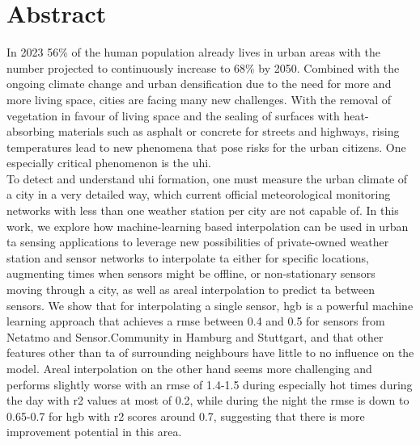 \chapter*{Abstract}
In 2023 56\% of the human population already lives in urban areas with the number projected to continuously increase to 68\% by 2050. Combined with the ongoing climate change and urban densification due to the need for more and more living space, cities are facing many new challenges. With the removal of vegetation in favour of living space and the sealing of surfaces with heat-absorbing materials such as asphalt or concrete for streets and highways, rising temperatures lead to new phenomena that pose risks for the urban citizens. One especially critical phenomenon is the \gls{uhi}.\\
To detect and understand \gls{uhi} formation, one must measure the urban climate of a city in a very detailed way, which current official meteorological monitoring networks with less than one weather station per city are not capable of. In this work, we explore how machine-learning based interpolation can be used in urban \gls{ta} sensing applications to leverage new possibilities of private-owned weather station and sensor networks to interpolate \gls{ta} either for specific locations, augmenting times when sensors might be offline, or non-stationary sensors moving through a city, as well as areal interpolation to predict \gls{ta} between sensors. We show that for interpolating a single sensor, \gls{hgb} is a powerful machine learning approach that achieves a \gls{rmse} between 0.4 and 0.5 for sensors from Netatmo and Sensor.Community in Hamburg and Stuttgart, and that other features other than \gls{ta} of surrounding neighbours have little to no influence on the model. Areal interpolation on the other hand seems more challenging and performs slightly worse with an \gls{rmse} of 1.4-1.5 during especially hot times during the day with \gls{r2} values at most of 0.2, while during the night the \gls{rmse} is down to 0.65-0.7 for \gls{hgb} with \gls{r2} scores around 0.7, suggesting that there is more improvement potential in this area.
